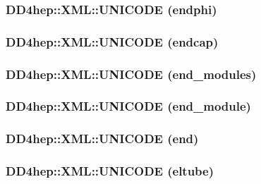 \hypertarget{namespace_d_d4hep_1_1_x_m_l_a8a8945afa2abad567660f2300ddd57ac}{
\subsubsection[{UNICODE}]{\setlength{\rightskip}{0pt plus 5cm}DD4hep::XML::UNICODE (endphi)}}
\label{namespace_d_d4hep_1_1_x_m_l_a8a8945afa2abad567660f2300ddd57ac}
\hypertarget{namespace_d_d4hep_1_1_x_m_l_ad2fa7fd572a2aff53ee1a32481231d97}{
\subsubsection[{UNICODE}]{\setlength{\rightskip}{0pt plus 5cm}DD4hep::XML::UNICODE (endcap)}}
\label{namespace_d_d4hep_1_1_x_m_l_ad2fa7fd572a2aff53ee1a32481231d97}
\hypertarget{namespace_d_d4hep_1_1_x_m_l_a71896f19880670155b5a791f993445f0}{
\subsubsection[{UNICODE}]{\setlength{\rightskip}{0pt plus 5cm}DD4hep::XML::UNICODE (end\_\-modules)}}
\label{namespace_d_d4hep_1_1_x_m_l_a71896f19880670155b5a791f993445f0}
\hypertarget{namespace_d_d4hep_1_1_x_m_l_a4ccbcefdca64e3237cce356697a67003}{
\subsubsection[{UNICODE}]{\setlength{\rightskip}{0pt plus 5cm}DD4hep::XML::UNICODE (end\_\-module)}}
\label{namespace_d_d4hep_1_1_x_m_l_a4ccbcefdca64e3237cce356697a67003}
\hypertarget{namespace_d_d4hep_1_1_x_m_l_af964c103691c510213490e00e9373639}{
\subsubsection[{UNICODE}]{\setlength{\rightskip}{0pt plus 5cm}DD4hep::XML::UNICODE (end)}}
\label{namespace_d_d4hep_1_1_x_m_l_af964c103691c510213490e00e9373639}
\hypertarget{namespace_d_d4hep_1_1_x_m_l_a8f000ee2b91c21acb1583c9eb9ec74a8}{
\subsubsection[{UNICODE}]{\setlength{\rightskip}{0pt plus 5cm}DD4hep::XML::UNICODE (eltube)}}
